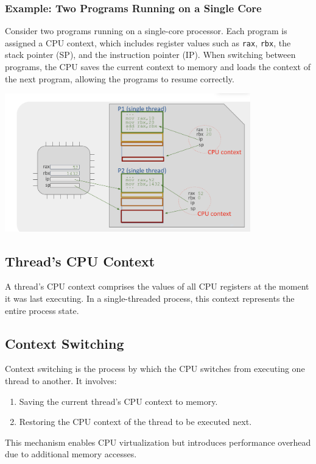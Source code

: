 \subsubsection{Example: Two Programs Running on a Single Core}
\begin{example}
Consider two programs running on a single-core processor. Each program is assigned a CPU context, which includes register values such as \texttt{rax}, \texttt{rbx}, the stack pointer (SP), and the instruction pointer (IP). When switching between programs, the CPU saves the current context to memory and loads the context of the next program, allowing the programs to resume correctly.
\end{example}

\begin{center}
    \includegraphics[width=0.8\textwidth]{chapters/L2/images/cpu_context.png}
\end{center}

\subsection{Thread's CPU Context}
\begin{definition}
A thread's CPU context comprises the values of all CPU registers at the moment it was last executing. In a single-threaded process, this context represents the entire process state.
\end{definition}

\subsection{Context Switching}
\begin{definition}
Context switching is the process by which the CPU switches from executing one thread to another. It involves:
\begin{enumerate}
    \item Saving the current thread's CPU context to memory.
    \item Restoring the CPU context of the thread to be executed next.
\end{enumerate}
This mechanism enables CPU virtualization but introduces performance overhead due to additional memory accesses.
\end{definition}

